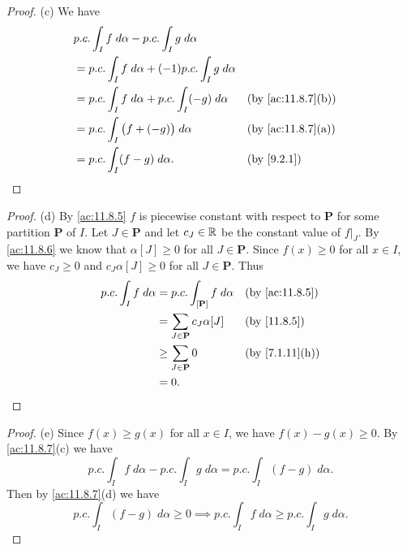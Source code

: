 \begin{proof}{(c)}
  We have
  \begin{align*}
     & p.c. \int_I f \; d \alpha - p.c. \int_I g \; d \alpha                                             \\
     & = p.c. \int_I f \; d \alpha + (-1) p.c. \int_I g \; d \alpha                                      \\
     & = p.c. \int_I f \; d \alpha + p.c. \int_I (-g) \; d \alpha   &  & \text{(by \cref{ac:11.8.7}(b))} \\
     & = p.c. \int_I \big(f + (-g)\big) \; d \alpha                 &  & \text{(by \cref{ac:11.8.7}(a))} \\
     & = p.c. \int_I (f - g) \; d \alpha.                           &  & \text{(by \cref{9.2.1})}
  \end{align*}
\end{proof}

\begin{proof}{(d)}
  By \cref{ac:11.8.5} \(f\) is piecewise constant with respect to \(\mathbf{P}\) for some partition \(\mathbf{P}\) of \(I\).
  Let \(J \in \mathbf{P}\) and let \(c_J \in \mathbb{R}\) be the constant value of \(f|_J\).
  By \cref{ac:11.8.6} we know that \(\alpha[J] \geq 0\) for all \(J \in \mathbf{P}\).
  Since \(f(x) \geq 0\) for all \(x \in I\), we have \(c_J \geq 0\) and \(c_J \alpha[J] \geq 0\) for all \(J \in \mathbf{P}\).
  Thus
  \begin{align*}
    p.c. \int_I f \; d \alpha & = p.c. \int_{[\mathbf{P}]} f \; d \alpha &  & \text{(by \cref{ac:11.8.5})} \\
                              & = \sum_{J \in \mathbf{P}} c_J \alpha[J]  &  & \text{(by \cref{11.8.5})}    \\
                              & \geq \sum_{J \in \mathbf{P}} 0           &  & \text{(by \cref{7.1.11}(h))} \\
                              & = 0.
  \end{align*}
\end{proof}

\begin{proof}{(e)}
  Since \(f(x) \geq g(x)\) for all \(x \in I\), we have \(f(x) - g(x) \geq 0\).
  By \cref{ac:11.8.7}(c) we have
  \[
    p.c. \int_I f \; d \alpha - p.c. \int_I g \; d \alpha = p.c. \int_I (f - g) \; d \alpha.
  \]
  Then by \cref{ac:11.8.7}(d) we have
  \[
    p.c. \int_I (f - g) \; d \alpha \geq 0 \implies p.c. \int_I f \; d \alpha \geq p.c. \int_I g \; d \alpha.
  \]
\end{proof}


